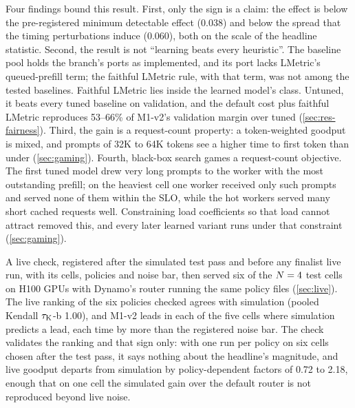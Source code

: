 Four findings bound this result. First, only the sign is a claim: the effect is below the
pre-registered minimum detectable effect (0.038) and below the spread that the timing perturbations
induce (0.060), both on the scale of the headline statistic. Second, the result is not ``learning
beats every heuristic''. The baseline pool holds the branch's ports as implemented, and its
 port lacks LMetric's queued-prefill term; the faithful LMetric rule, with that term,
was not among the tested baselines. Faithful LMetric lies inside the learned model's class.
Untuned, it beats every tuned baseline on validation, and the default cost plus faithful LMetric
reproduces 53--66\% of M1-v2's validation margin over tuned 
(\cref{sec:res-fairness}). Third, the gain is a request-count property: a token-weighted goodput is
mixed, and prompts of 32K to 64K tokens see a higher time to first token than under
 (\cref{sec:gaming}). Fourth, black-box search games a request-count objective. The
first tuned model drew very long prompts to the worker with the most outstanding prefill; on the
heaviest cell one worker received only such prompts and served none of them within the SLO, while
the hot workers served many short cached requests well. Constraining load coefficients so that load
cannot attract removed this, and every later learned variant runs under that constraint
(\cref{sec:gaming}).

A live check, registered after the simulated test pass and before any finalist live run, with its
cells, policies and noise bar, then served six of the $N = 4$ test cells on H100 GPUs with
Dynamo's router running the same policy files (\cref{sec:live}).
The live ranking of the six policies checked agrees with simulation (pooled Kendall $\tau_{\mathrm{K}}$-b
1.00), and M1-v2 leads  in each of the five cells where simulation predicts a lead,
each time by more than the registered noise bar.
The check validates the ranking and that sign only: with one run per policy on six cells chosen
after the test pass, it says nothing about the headline's magnitude, and live goodput departs from
simulation by policy-dependent factors of 0.72 to 2.18, enough that on one cell the simulated gain
over the default router is not reproduced beyond live noise.

